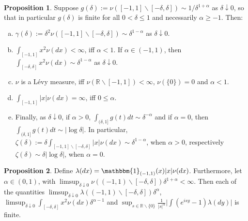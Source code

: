 \documentclass[pdftex,oneside,11pt,reqno]{amsart}
\theoremstyle{definition}
\theoremstyle{theorem}
\newtheorem{proposition}{Proposition}[section]
\theoremstyle{remark}
\numberwithin{equation}{section}
\numberwithin{definition}{section}
\begin{document}
\begin{proposition}\label{proposition:generally_on_measure_asymptotics}
Suppose $g(\delta):=\nu([-1,1]\backslash [-\delta,\delta])\sim 1/\delta^{1+\alpha}$ as $\delta\downarrow 0$, so that in particular $g(\delta)$ is finite for all $0<\delta\leq 1$ and necessarily $\alpha\geq -1$. Then:
\begin{enumerate}[(a)]
\item\label{asymptoptic:a} $\gamma(\delta):=\delta^2\nu([-1,1]\backslash [-\delta,\delta])\sim \delta^{1-\alpha}$ as $\delta\downarrow 0$. 
\item\label{asymptoptic:b} $\int_{[-1,1]} x^2\nu(dx)<\infty$, iff $\alpha<1$. If $\alpha\in (-1,1)$, then $\int_{[-\delta,\delta]} x^2\nu(dx)\sim \delta^{1-\alpha}$ as $\delta\downarrow 0$. 
\item\label{asymptoptic:c} $\nu$ is a L\'evy measure, iff $\nu(\mathbb{R}\backslash [-1,1])<\infty$, $\nu(\{0\})=0$ and $\alpha<1$. 
\item\label{asymptoptic:d} $\int_{[-1,1]} \vert x\vert \nu(dx)=\infty$, iff $0\leq \alpha$. 
\item\label{asymptoptic:e} Finally, as $\delta\downarrow 0$, if $\alpha>0$, $\int_{(\delta,1]}g(t)dt\sim \delta^{-\alpha}$ and if $\alpha=0$, then $\int_{(\delta,1]}g(t)dt\sim \vert \log\delta\vert$. In particular, $\zeta(\delta):=\delta \int_{[-1,1]\backslash [-\delta,\delta]}\vert x\vert \nu(dx)\sim \delta^{1-\alpha}$, when $\alpha>0$, respectively $\zeta(\delta)\sim \delta\vert \log\delta\vert$, when $\alpha=0$.
\end{enumerate}
\end{proposition}

\begin{proposition}\label{proposition:generally_on_measure_asymptotics_bis}
Define $\lambda(dx)=\mathbbm{1}_{(-1,1)}(x)\vert x\vert\nu(dx)$. Furthermore, let $\alpha\in (0,1)$, with $\limsup_{\delta\downarrow 0}\nu((-1,1)\backslash [-\delta,\delta])\delta^{1+\alpha}<\infty$. Then each of the quantities $\limsup_{\delta\downarrow 0}\lambda((-1,1)\backslash [-\delta,\delta])\delta^{\alpha}$, $\limsup_{\delta\downarrow 0}\int_{[-\delta,\delta]}x^2\nu(dx)\delta^{\alpha-1}$ and $\sup_{s\in \mathbb{R}\backslash \{0\}}\frac{1}{\vert s\vert^\alpha}\vert \int (e^{isy}-1)\lambda(dy)\vert$ is finite.
\end{proposition}
\end{document}
